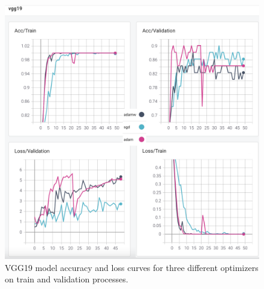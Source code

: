 \begin{figure}[!h]
    \centering
    \includegraphics[width=\linewidth]{fig/vgg19.png}
    \vspace{2mm}
    \caption{VGG19 model accuracy and loss curves for three different optimizers on train and validation processes.}
    \label{fig:vgg19_plots}
\end{figure}

